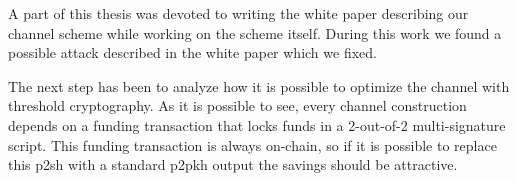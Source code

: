 \documentclass{llncs}
\begin{document}
A part of this thesis was devoted to writing the white paper describing our channel scheme while working on the scheme itself. During this work we found a possible attack described in the white paper which we fixed.

The next step has been to analyze how it is possible to optimize the channel with threshold cryptography. As it is possible to see, every channel construction depends on a funding transaction that locks funds in a 2-out-of-2 multi-signature script. This funding transaction is always on-chain, so if it is possible to replace this \gls{p2sh} with a standard \gls{p2pkh} output the savings should be attractive.

%
%
\printbibliography

%
%
\printglossaries
\end{document}
